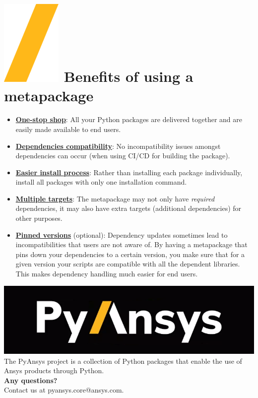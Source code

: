 \documentclass[a0paper,fleqn]{src/betterposter}
\begin{document}
{\section{\includegraphics[height=\fontcharht\font`\S]{img/general/slash.png} Benefits of using a\\ metapackage}
\vspace{-2cm}
\begin{itemize}
    \item \underline{\textbf{One-stop shop}}: All your Python packages are delivered together and are easily made available to end users.
    \item \underline{\textbf{Dependencies compatibility}}: No incompatibility issues amongst dependencies can occur (when using CI/CD for building the package).
    \item \underline{\textbf{Easier install process}}: Rather than installing each package individually, install all packages with only one installation command.
    \item \underline{\textbf{Multiple targets}}: The metapackage may not only have \textit{required} dependencies, it may also have extra targets (additional dependencies) for other purposes.
    \item \underline{\textbf{Pinned versions}} (optional): Dependency updates sometimes lead to incompatibilities that users are not aware of. By having a metapackage that pins down your dependencies to a certain version, you make sure that for a given version your scripts are compatible with all the dependent libraries. This makes dependency handling much easier for end users.

\end{itemize}
\vfill

\includegraphics[width=\textwidth]{img/general/pyansys_dark}\\
The PyAnsys project is a collection of Python packages that enable the use of Ansys products through Python.
\\
\newline
\textbf{Any questions?} \\Contact us at pyansys.core@ansys.com.
\\
\newline

}
\end{document}
